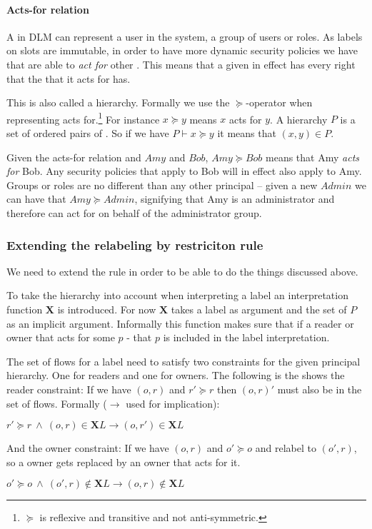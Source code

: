 \paragraph{Acts-for relation}
A \principal{} in DLM can represent a user in the system, a group of users or roles.
As labels on slots are immutable, in order to have more dynamic security policies we have that \principals{} are able to \textit{act for} other \principals{}.
This means that a given \principal{} in effect has every right that the \principal{} that it acts for has.

This is also called a \principal{} hierarchy.
Formally we use the $\succeq$-operator when representing acts for.\footnote{$\succeq$ is reflexive and transitive and not anti-symmetric.}
For instance $x \succeq y$ means $x$ acts for $y$.
A \principal{} hierarchy $P$ is a set of ordered pairs of \principals{}.
So if we have $P \vdash x \succeq y$ it means that $(x,y) \in P$.

Given the acts-for relation and \principals{} $Amy$ and $Bob$, $Amy \succeq Bob$ means that Amy \textit{acts for} Bob.
Any security policies that apply to Bob will in effect also apply to Amy.
Groups or roles are no different than any other principal -- given a new \principal{} $Admin$ we can have that $Amy \succeq Admin$, signifying that Amy is an administrator and therefore can act for on behalf of the administrator group.

\subsubsection{Extending the relabeling by restriciton rule}
We need to extend the rule in order to be able to do the things discussed above.

To take the \principal{} hierarchy into account when interpreting a label an interpretation function $\textbf{X}$ is introduced.
For now $\textbf{X}$ takes a label as argument and the set of \principals{} $P$ as an implicit argument.
Informally this function makes sure that if a reader or owner that acts for some \principal{} $p$ - that $p$ is included in the label interpretation.

The set of flows for a label need to satisfy two constraints for the given principal hierarchy.
One for readers and one for owners.
The following is the shows the reader constraint:
If we have $(o,r)$ and $r' \succeq r$ then $(o,r)'$ must also be in the set of flows.
Formally ($\rightarrow$ used for implication):
\begin{center}
  $r' \succeq r \ \wedge \ (o,r) \in \textbf{X}L \rightarrow (o,r') \in \textbf{X}L$
\end{center}
And the owner constraint:
If we have $(o,r)$ and $o' \succeq o$ and relabel to $(o',r)$, so a owner gets replaced by an owner that acts for it.
\begin{center}
  $o' \succeq o \ \wedge \ (o',r) \notin \textbf{X}L \rightarrow (o,r) \notin \textbf{X}L$
\end{center}

